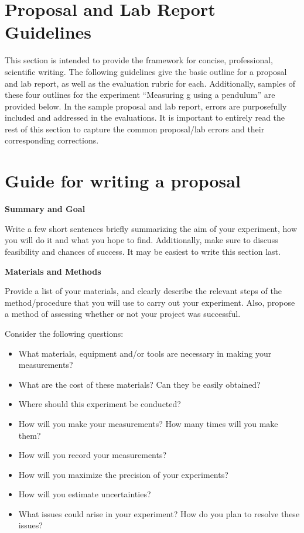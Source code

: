\newpage
\section{Proposal and Lab Report Guidelines}

This section is intended to provide the framework for concise, professional, scientific writing. The following guidelines give the basic outline for a proposal and lab report, as well as the evaluation rubric for each. Additionally, samples of these four outlines for the experiment ``Measuring g using a pendulum'' are provided below. In the sample proposal and lab report, errors are purposefully included and addressed in the evaluations. It is important to entirely read the rest of this section to capture the common proposal/lab errors and their corresponding corrections.

\newpage
\section{Guide for writing a proposal}
 \vspace{0.25cm}
\textbf{Summary and Goal}

Write a few short sentences briefly summarizing the aim of your experiment, how you will do it and what you hope to find. Additionally, make sure to discuss feasibility and chances of success. It may be easiest to write this section last.

\textbf{Materials and Methods}

Provide a list of your materials, and clearly describe the relevant steps of the method/procedure that you will use to carry out your experiment. Also, propose a method of assessing whether or not your project was successful. 

Consider the following questions:
\begin{itemize}
\item What materials, equipment and/or tools are necessary in making your measurements?
\item What are the cost of these materials? Can they be easily obtained?
\item Where should this experiment be conducted?
\item How will you make your measurements? How many times will you make them?
\item How will you record your measurements?
\item How will you maximize the precision of your experiments?
\item How will you estimate uncertainties?
\item What issues could arise in your experiment? How do you plan to resolve these issues?
\end{itemize}

